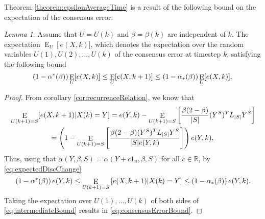 \documentclass{amsart}
\DeclareMathOperator{\E}{E}
\newcommand{\R}[0]{\mathbb{R}}
\theoremstyle{remark}
\newtheorem{lemma}{Lemma}
\begin{document}
Theorem \ref{theorem:epsilonAverageTime} is a result of the following bound on the expectation of the consensus error:
\begin{lemma}{\label{lem:expectationBound}}
	Assume that $U=U(k)$ and $\beta=\beta(k)$ are independent of $k$. The expectation $\E_{U}\left[e(X,k)]$, which denotes the expectation over the random variables $U(1),U(2),\ldots,U(k)$ of the consensus error at timestep $k$, satisfying the following bound
\begin{equation}{\label{eq:consensusErrorBound}}
	(1-\alpha^*(\beta))\E_{U}[e(X,k)] \leq \E_{U}[e(X,k+1)]\leq(1-\alpha_*(\beta))\E_{U}[e(X,k)].
\end{equation}
\end{lemma}
\begin{proof}
From corollary \ref{cor:recurrenceRelation}, we know that
\begin{multline}{\label{eq:expectedDiscChange}}
	\E_{U(k+1)=S}[e(X,k+1)|X(k)=Y] = e(Y,k) - \E_{U(k+1)=S}\left[\frac{\beta(2-\beta)}{|S|}(Y^S)^TL_{|S|}Y^S\right] \\= \left(1 - \E_{U(k+1)=S}\left[\frac{\beta(2-\beta)(Y^S)^TL_{|S|}Y^S}{|S|e(Y,k)}\right]\right)e(Y,k),
\end{multline}
Thus, using that $\alpha(Y,\beta,S) = \alpha(Y+c1_n,\beta,S)$ for all $c\in\R$, by \eqref{eq:expectedDiscChange}
\begin{equation}{\label{eq:intermediateBound}}
	\left(1-\alpha^*(\beta)\right)e(Y,k)\leq\E_{U(k+1)=S}\left[e(X,k+1)|X(k)=Y\right]\leq\left(1-\alpha_*(\beta)\right)e(Y,k).
\end{equation}
Taking the expectation over $U(1),\ldots,U(k)$ of both sides of \eqref{eq:intermediateBound} results in \eqref{eq:consensusErrorBound}.
\end{proof}
\end{document}
